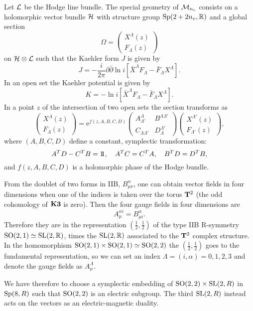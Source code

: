 \documentclass[a4paper,12pt]{article}
\begin{document}
Let $\mathcal{L}$ be the Hodge line bundle. The special geometry
\cite{str,cdf,cedf} of $\mathcal{M}_{n_v}$ consists on a holomorphic
vector bundle $\mathcal{H}$ with structure group $\mathrm{Sp}(2+2n_v,\mathbb{R})$ and a
global section
$$\Omega=\begin{pmatrix}
X^\Lambda(z)\\F_\Lambda(z)\end{pmatrix}$$ on $\mathcal{H}\otimes \mathcal{L}$ such
that the Kaehler form $J$ is given by
$$J=-\frac i {2\pi} \partial\bar \partial\ln i[\bar X^\Lambda F_\Lambda-\bar F_\Lambda X^\Lambda].$$
In an open set the Kaehler potential is given by
$$K=-\ln i[\bar X^\Lambda F_\Lambda-\bar F_\Lambda X^\Lambda].$$
 In a point $z$ of the intersection of two open sets the section
transforms as
$$\begin{pmatrix}
X^\Lambda(z)\\F_\Lambda(z)\end{pmatrix}=
\mathrm{e}^{f(z,A,B,C,D)}\begin{pmatrix}
A^\Lambda_{\Lambda'}&B^{\Lambda\Lambda'}\\C_{\Lambda\Lambda'}& D
_\Lambda^{\Lambda'}\end{pmatrix}\begin{pmatrix}
X^{\Lambda'}(z)\\F_{\Lambda'}(z)\end{pmatrix},$$ where  $({A,B,C,
D})$ define a constant, symplectic transformation:
$$A^TD-C^TB=\relax{\rm 1\kern-.28em 1}, \quad A^TC=C^TA, \quad B^TD=D^TB,$$ and
$f(z,A,B,C,D)$ is a holomorphic phase of the Hodge bundle.

\bigskip

From the doublet of two forms in IIB, $B_{\mu\nu}^\alpha$, one can
obtain vector fields in four dimensions when one of the indices is
taken over the torus $\mathbf{T}^2$ (the odd cohomology of $\mathbf{K3}$ is zero).
Then the four gauge fields  in four dimensions are \cite{tt}
$$A_\mu^{\alpha i}= B_{\mu i}^\alpha.$$
Therefore they are in the  representation  $(\frac 1 2, \frac 1
2)$ of the type IIB R-symmetry $\mathrm{SO}(2,1)\simeq\mathrm{SL}(2, \mathbb{R})$, times
the $\mathrm{SL}(2,\mathbb{R})$ associated to the $\mathbf{T}^2$ complex structure. In
the homomorphism $\mathrm{SO}(2,1)\times\mathrm{SO}(2,1)\simeq\mathrm{SO}(2,2)$ the
$(\frac 1 2, \frac 1 2)$ goes to the fundamental representation,
so we can set an index $\Lambda=(i,\alpha)=0,1,2,3$ and denote the
gauge fields as $A^\Lambda_\mu$.


We have therefore to choose a symplectic embedding of $\mathrm{SO}(2,2)
\times \mathrm{SL}(2,R)$ in $\mathrm{Sp}(8, R)$ such that $\mathrm{SO}(2,2)$ is an
electric subgroup. The third $\mathrm{SL}(2,R)$ instead acts on the
vectors as an electric-magnetic duality.
\end{document}

